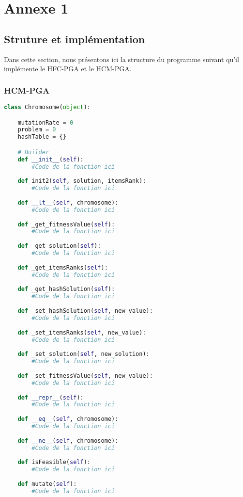 \chapter{Annexe 1}

\section{Struture et implémentation}
	
	Dans cette section, nous présentons ici la structure du programme suivant qu'il implémente le HFC-PGA et le HCM-PGA.
	
	\subsection{HCM-PGA}
	
	\begin{lstlisting}[language=python]
class Chromosome(object):

	mutationRate = 0
	problem = 0
	hashTable = {}

	# Builder 
	def __init__(self):
		#Code de la fonction ici
	
	def init2(self, solution, itemsRank):
		#Code de la fonction ici
	
	def __lt__(self, chromosome):
		#Code de la fonction ici
	
	def _get_fitnessValue(self):
		#Code de la fonction ici
	
	def _get_solution(self):
		#Code de la fonction ici
	
	def _get_itemsRanks(self):
		#Code de la fonction ici
	
	def _get_hashSolution(self):
		#Code de la fonction ici
	
	def _set_hashSolution(self, new_value):
		#Code de la fonction ici
	
	def _set_itemsRanks(self, new_value):
		#Code de la fonction ici
	
	def _set_solution(self, new_solution):
		#Code de la fonction ici
	
	def _set_fitnessValue(self, new_value):
		#Code de la fonction ici
	
	def __repr__(self):
		#Code de la fonction ici
	
	def __eq__(self, chromosome):
		#Code de la fonction ici
	
	def __ne__(self, chromosome):
		#Code de la fonction ici
	
	def isFeasible(self):
		#Code de la fonction ici
	
	def mutate(self):
		#Code de la fonction ici
	

\end{lstlisting}
